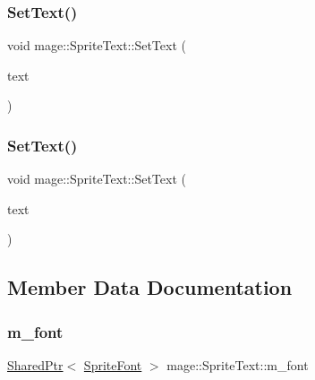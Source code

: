 \hypertarget{classmage_1_1_sprite_text_a03d5012e2812d422a1285a4a0abb104f}{}\label{classmage_1_1_sprite_text_a03d5012e2812d422a1285a4a0abb104f} 
\subsubsection{\texorpdfstring{Set\+Text()}{SetText()}\hspace{0.1cm}{\footnotesize\ttfamily [2/3]}}
{\footnotesize\ttfamily void mage\+::\+Sprite\+Text\+::\+Set\+Text (\begin{DoxyParamCaption}\item[{const wchar\+\_\+t $\ast$}]{text }\end{DoxyParamCaption})}

\hypertarget{classmage_1_1_sprite_text_ab9f28cf44b29b8489794938a8965f104}{}\label{classmage_1_1_sprite_text_ab9f28cf44b29b8489794938a8965f104} 
\subsubsection{\texorpdfstring{Set\+Text()}{SetText()}\hspace{0.1cm}{\footnotesize\ttfamily [3/3]}}
{\footnotesize\ttfamily void mage\+::\+Sprite\+Text\+::\+Set\+Text (\begin{DoxyParamCaption}\item[{const \hyperlink{structmage_1_1_sprite_text_item}{Sprite\+Text\+Item} \&}]{text }\end{DoxyParamCaption})}



\subsection{Member Data Documentation}
\hypertarget{classmage_1_1_sprite_text_a922e37fbcbc431e815ebabe82e4528b0}{}\label{classmage_1_1_sprite_text_a922e37fbcbc431e815ebabe82e4528b0} 
\subsubsection{\texorpdfstring{m\+\_\+font}{m\_font}}
{\footnotesize\ttfamily \hyperlink{namespacemage_a1e01ae66713838a7a67d30e44c67703e}{Shared\+Ptr}$<$ \hyperlink{classmage_1_1_sprite_font}{Sprite\+Font} $>$ mage\+::\+Sprite\+Text\+::m\+\_\+font\hspace{0.3cm}{\ttfamily [private]}}

